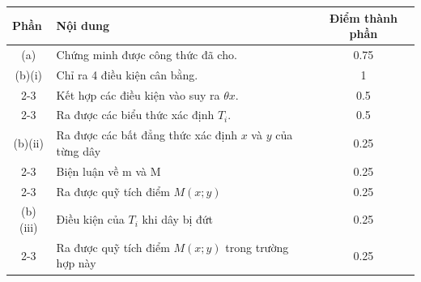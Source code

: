     \begin{center}
    \begin{tabular}{|c|p{8cm}|c|}
    \hline
    \multicolumn{1}{|l|}{Phần} & Nội dung & Điểm thành phần \\ 
    \hline
\multirow{1}{*}{(a)} & Chứng minh được công thức đã cho.
                     & 0.75
                     \\
                     \hline  
\multirow{1}{*}{(b)(i)} & Chỉ ra 4 điều kiện cân bằng.                                  
                     & 1    
                     \\
                     \cline{2-3}
                     & Kết hợp các điều kiện vào suy ra $\theta x$. 
                     & 0.5
                     \\
                     \cline{2-3}
                     & Ra được các biểu thức xác định $T_i$. 
                     & 0.5
                     \\
                     \hline
\multirow{1}{*}{(b)(ii)}& Ra được các bất đẳng thức xác định $x$ và $y$ của từng dây
                     & 0.25    
                     \\
                     \cline{2-3}
                     & Biện luận về m và M
                     & 0.25
                     \\
                     \cline{2-3}
                     & Ra được quỹ tích điểm $M(x;y)$
                     & 0.25
                     \\
                     \hline
\multirow{1}{*}{(b)(iii)}& Điều kiện của $T_i$ khi dây bị đứt
                     & 0.25    
                     \\
                     \cline{2-3}
                     & Ra được quỹ tích điểm $M(x;y)$ trong trường hợp này
                     & 0.25
                     \\
                     \hline
    \end{tabular}
    \end{center}